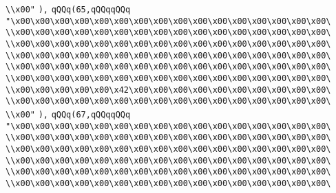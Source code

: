 \verb|\\x00"|\newline
\verb|),|\newline
\verb|qQQq(65,qQQqqQQq|\newline
\verb|"\x00\x00\x00\x00\x00\x00\x00\x00\x00\x00\x00\x00\x00\x00\x00\x00\|\newline
\verb|\\x00\x00\x00\x00\x00\x00\x00\x00\x00\x00\x00\x00\x00\x00\x00\x00\|\newline
\verb|\\x00\x00\x00\x00\x00\x00\x00\x00\x00\x00\x00\x00\x00\x00\x00\x00\|\newline
\verb|\\x00\x00\x00\x00\x00\x00\x00\x00\x00\x00\x00\x00\x00\x00\x00\x00\|\newline
\verb|\\x00\x00\x00\x00\x00\x00\x00\x00\x00\x00\x00\x00\x00\x00\x00\x00\|\newline
\verb|\\x00\x00\x00\x00\x00\x00\x00\x00\x00\x00\x00\x00\x00\x00\x00\x00\|\newline
\verb|\\x00\x00\x00\x00\x00\x42\x00\x00\x00\x00\x00\x00\x00\x00\x00\x00\|\newline
\verb|\\x00\x00\x00\x00\x00\x00\x00\x00\x00\x00\x00\x00\x00\x00\x00\x00\|\newline
\verb|\\x00"|\newline
\verb|),|\newline
\verb|qQQq(67,qQQqqQQq|\newline
\verb|"\x00\x00\x00\x00\x00\x00\x00\x00\x00\x00\x00\x00\x00\x00\x00\x00\|\newline
\verb|\\x00\x00\x00\x00\x00\x00\x00\x00\x00\x00\x00\x00\x00\x00\x00\x00\|\newline
\verb|\\x00\x00\x00\x00\x00\x00\x00\x00\x00\x00\x00\x00\x00\x00\x00\x00\|\newline
\verb|\\x00\x00\x00\x00\x00\x00\x00\x00\x00\x00\x00\x00\x00\x00\x00\x00\|\newline
\verb|\\x00\x00\x00\x00\x00\x00\x00\x00\x00\x00\x00\x00\x00\x00\x00\x00\|\newline
\verb|\\x00\x00\x00\x00\x00\x00\x00\x00\x00\x00\x00\x00\x00\x00\x00\x00\|\newline
